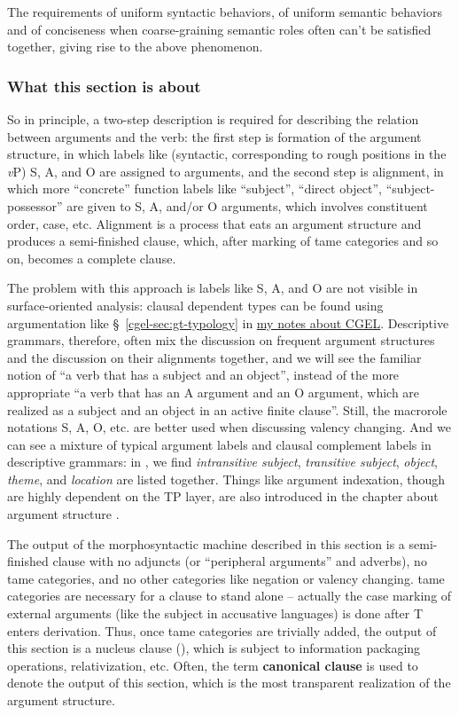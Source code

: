 \documentclass[UTF8, a4paper, oneside, scheme=plain]{ctexart}
\newcommand*{\citesec}[1]{\S~{#1}}
\newcommand*{\citechap}[1]{chap.~{#1}}
\newcommand*{\concept}[1]{\textbf{#1}}
\newcommand*{\term}[1]{\emph{#1}}
\newcommand*{\vP}{\textit{v}P}
\newcommand{\cgel}{\href{../English/cambridge.pdf}{my notes about CGEL}}
\begin{document}
The requirements of uniform syntactic behaviors, 
of uniform semantic behaviors and of conciseness
when coarse-graining semantic roles 
often can't be satisfied together,
giving rise to the above phenomenon.

\subsubsection{What this section is about}\label{sec:about-argument-structure-sec}

So in principle, a two-step description is required for 
describing the relation between arguments and the verb:
the first step is formation of the argument structure,
in which labels like (syntactic, corresponding to rough positions in the \vP) S, A, and O 
are assigned to arguments,
and the second step is alignment,
in which more ``concrete'' function labels 
like ``subject'', ``direct object'', ``subject-possessor''
are given to S, A, and/or O arguments,
which involves constituent order, case, etc.
Alignment is a process that eats an argument structure 
and produces a semi-finished clause,
which, after marking of \ac{tame} categories and so on,
becomes a complete clause.

The problem with this approach is labels like S, A, and O are not visible in surface-oriented analysis:
clausal dependent types can be found using argumentation like 
\citesec{\ref{cgel-sec:gt-typology}} in \cgel.
Descriptive grammars, therefore,
often mix the discussion on frequent argument structures 
and the discussion on their alignments together, 
and we will see the familiar notion of ``a verb that has a subject and an object'',
instead of the more appropriate ``a verb that has an A argument and an O argument, %
which are realized as a subject and an object 
in an active finite clause''.
Still, the macrorole notations S, A, O, etc. are better used when discussing valency changing.
And we can see a mixture of typical argument labels and clausal complement labels
in descriptive grammars:
in \citet[\citesec{8.1}]{jacques2021grammar},
we find \term{intransitive subject}, \term{transitive subject}, \term{object},
\term{theme}, and \term{location} are listed together. 
Things like argument indexation,
though are highly dependent on the TP layer,
are also introduced in the chapter about argument structure 
\citet[\citechap{14}]{jacques2021grammar}.

The output of the morphosyntactic machine described in this section 
is a semi-finished clause with no adjuncts (or ``peripheral arguments'' and adverbs),
no \ac{tame} categories, and no other categories like negation or valency changing.
\ac{tame} categories are necessary for a clause to stand alone
-- actually the case marking of external arguments 
(like the subject in accusative languages) 
is done after T enters derivation.
Thus, once \ac{tame} categories are trivially added,
the output of this section is a nucleus clause (),
which is subject to information packaging operations,
relativization, etc.
Often, the term \concept{canonical clause} is used to denote the output of this section,
which is the most transparent realization of the argument structure.
\end{document}
